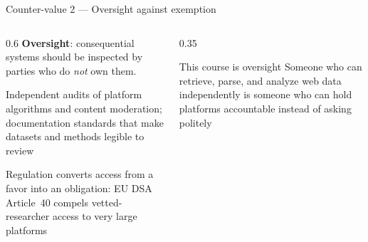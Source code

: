 \documentclass[9pt,aspectratio=169]{beamer}
\begin{document}
\begin{frame}{Counter-value 2 --- Oversight against exemption}
    \begin{columns}[T]
        \begin{column}{0.6\textwidth}
            \textbf{Oversight}: consequential systems should be inspected by parties who do \textit{not} own them.

            \medskip
            
            Independent audits of platform algorithms and content moderation; documentation standards that make datasets and methods legible to review

            \medskip
            
            Regulation converts access from a favor into an obligation: EU DSA Article~40 compels vetted-researcher access to very large platforms
        \end{column}
        \begin{column}{0.35\textwidth}
            \begin{alertblock}{This course is oversight}
                \small Someone who can retrieve, parse, and analyze web data independently is someone who can hold platforms accountable instead of asking politely
            \end{alertblock}
        \end{column}
    \end{columns}
\end{frame}
\end{document}
